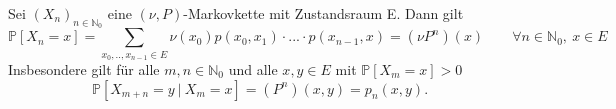 \label{"Satz 1.8"}
Sei ${(X_{n})}_{n \in \mathbb{N}_{0}}$ eine $(\nu,P)$-Markovkette mit Zustandsraum E. Dann gilt
\begin{equation*}
\mathbb{P}[X_{n} = x] = \sum_{x_{0},..,x_{n-1} \in E} \nu(x_{0}) p(x_{0},x_{1}) \cdot ...\cdot p(x_{n-1},x) = (\nu P^{n})(x) \qquad \forall n \in \mathbb{N}_{0}, \: x \in E
\end{equation*}
Insbesondere gilt für alle $m,n \in \mathbb{N}_{0}$ und alle $x,y \in E$ mit $\mathbb{P}[X_{m} = x]>0$
\begin{equation*}
\mathbb{P}[X_{m+n}=y \: | \: X_{m} = x] = (P^{n})(x,y) = p_{n}(x,y).
\end{equation*}
